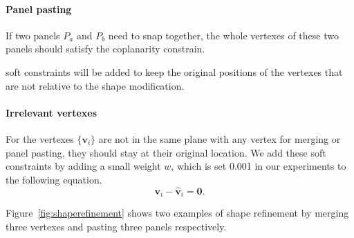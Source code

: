 {\paragraph{Panel pasting}
If two panels $P_a$ and $P_b$ need to snap together, the whole vertexes of these two panels should satisfy the coplanarity constrain. 



 soft constraints will be added to keep the original positions of the vertexes that are not relative to the shape modification.

\paragraph{Irrelevant vertexes} For the vertexes $\{\mathbf{v}_i\}$ are not in the same plane with any vertex for merging or panel pasting, they should stay at their original location. 
We add these soft constraints by adding a small weight $w$, which is set 0.001 in our experiments to the following equation. 
\begin{equation}
\mathbf{v}_i - \mathbf{\hat{v}}_i = \mathbf{0}.
\label{equ:irrelevant}
\end{equation}

Figure~\ref{fig:shaperefinement} shows two examples of shape refinement by merging three vertexes and pasting three panels respectively. 

}
